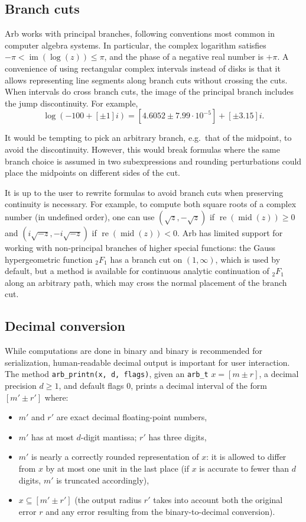 \documentclass[10pt,journal,compsoc,cspaper]{IEEEtran}
\begin{document}
\subsection{Branch cuts}

Arb works with principal branches, following
conventions most common in
computer algebra systems. In particular, the complex logarithm satisfies
$-\pi < \operatorname{im}(\log(z)) \le \pi$,
and the phase of a negative real number is $+\pi$.
A convenience of using rectangular complex intervals instead of
disks is that it allows representing line segments along branch cuts
without crossing the cuts.
When intervals do cross branch cuts, the image of the principal branch
includes the jump discontinuity.
For example,
$$\log(-100 + [\pm 1] i) = [4.6052 \pm 7.99 \cdot 10^{-5}] + [\pm 3.15] i.$$

It would be tempting to pick an arbitrary branch, e.g.\
that of the midpoint, to avoid the discontinuity.
However, this would break formulas where the same branch choice is assumed
in two subexpressions and rounding perturbations could place
the midpoints on different sides of the cut.

It is up to the user to rewrite formulas
to avoid branch cuts when preserving continuity is necessary.
For example, to compute both square roots of a complex number
(in undefined order), one can use
$(\sqrt{z}, -\sqrt{z})$ if $\operatorname{re}(\operatorname{mid}(z)) \ge 0$
and $(i \sqrt{-z}, -i \sqrt{-z})$
if $\operatorname{re}(\operatorname{mid}(z)) < 0$.
Arb has limited support for working with non-principal
branches of higher special functions: the Gauss hypergeometric function
${}_2F_1$ has a branch cut on $(1,\infty)$, which is used by default,
but a method is available for continuous
analytic continuation of ${}_2F_1$ along an arbitrary path,
which may cross the normal placement of the branch cut.

\subsection{Decimal conversion}

While computations are done in binary and binary
is recommended for serialization,
human-readable decimal output is important for user interaction.
The method \texttt{arb\_printn(x, d, flags)},
given an \texttt{arb\_t} $x = [m \pm r]$,
a decimal precision $d \ge 1$, and default flags 0,
prints a decimal interval of the form
$[m' \pm r']$ where:
\begin{itemize}
\item $m'$ and $r'$ are exact decimal floating-point numbers,
\item $m'$ has at most $d$-digit mantissa; $r'$ has three digits,
\item $m'$ is nearly a correctly rounded representation of $x$: it is allowed to differ from $x$ by at most one unit in the last place
(if $x$ is accurate to fewer than $d$ digits, $m'$ is truncated accordingly),
\item $x \subseteq [m' \pm r']$ (the output radius $r'$ takes into account both the original error $r$ and any error resulting from the binary-to-decimal conversion).
\end{itemize}
\end{document}
